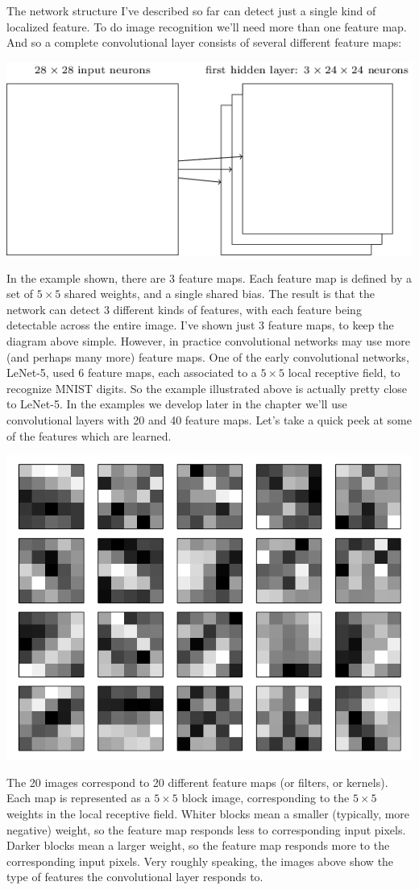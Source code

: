 \documentclass[a4paper,twoside,10pt]{book}
\begin{document}
The network structure I've described so far can detect just a single kind of localized feature. To do image recognition we'll need more than one feature map. And so a complete convolutional layer consists of several different feature maps:
\begin{center}
	\includegraphics[height=0.3\linewidth]{figures/ch6/tikz46}
\end{center}
In the example shown, there are 3 feature maps. Each feature map is defined by a set of $5\times5$ shared weights, and a single shared bias. The result is that the network can detect 3 different kinds of features, with each feature being detectable across the entire image.
I've shown just 3 feature maps, to keep the diagram above simple. However, in practice convolutional networks may use more (and perhaps many more) feature maps. One of the early convolutional networks, LeNet-5, used 6 feature maps, each associated to a $5\times5$ local receptive field, to recognize MNIST digits. So the example illustrated above is actually pretty close to LeNet-5. In the examples we develop later in the chapter we'll use convolutional layers with 20 and 40 feature maps. Let's take a quick peek at some of the features which are learned.%
\begin{center}
	\includegraphics[width=0.6\linewidth]{figures/ch6/net_full_layer_0}
\end{center}
The 20 images correspond to 20 different feature maps (or filters, or kernels). Each map is represented as a $5\times5$ block image, corresponding to the $5\times5$ weights in the local receptive field. Whiter blocks mean a smaller (typically, more negative) weight, so the feature map responds less to corresponding input pixels. Darker blocks mean a larger weight, so the feature map responds more to the corresponding input pixels. Very roughly speaking, the images above show the type of features the convolutional layer responds to.
\end{document}
